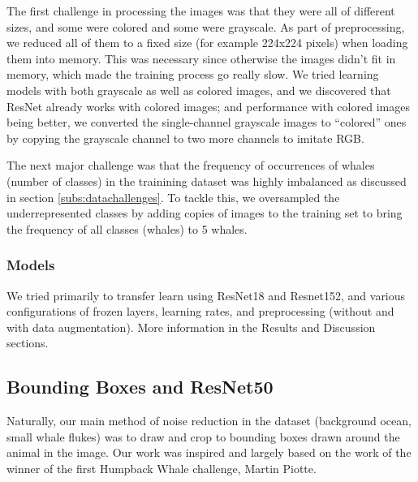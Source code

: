 The first challenge in processing the images was that they were all of different sizes, and some were colored and some were grayscale. As part of preprocessing, we reduced all of them to a fixed size (for example 224x224 pixels) when loading them into memory. This was necessary since otherwise the images didn't fit in memory, which made the training process go really slow. We tried learning models with both grayscale as well as colored images, and we discovered that ResNet already works with colored images; and performance with colored images being better, we converted the single-channel grayscale images to ``colored'' ones by copying the grayscale channel to two more channels to imitate RGB.

The next major challenge was that the frequency of occurrences of whales (number of classes) in the trainining dataset was highly imbalanced as discussed in section \ref{subs:datachallenges}. To tackle this, we oversampled the underrepresented classes by adding copies of images to the training set to bring the frequency of all classes (whales) to 5 whales.

\subsubsection{Models}

We tried primarily to transfer learn using ResNet18 and Resnet152, and various configurations of frozen layers, learning rates, and preprocessing (without and with data augmentation). More information in the Results and Discussion sections.

\subsection{Bounding Boxes and ResNet50}

Naturally, our main method of noise reduction in the dataset (background ocean, small whale flukes) was to draw and crop to bounding boxes drawn around the animal in the image. Our work was inspired and largely based on the work of the winner of the first Humpback Whale challenge, Martin Piotte.
